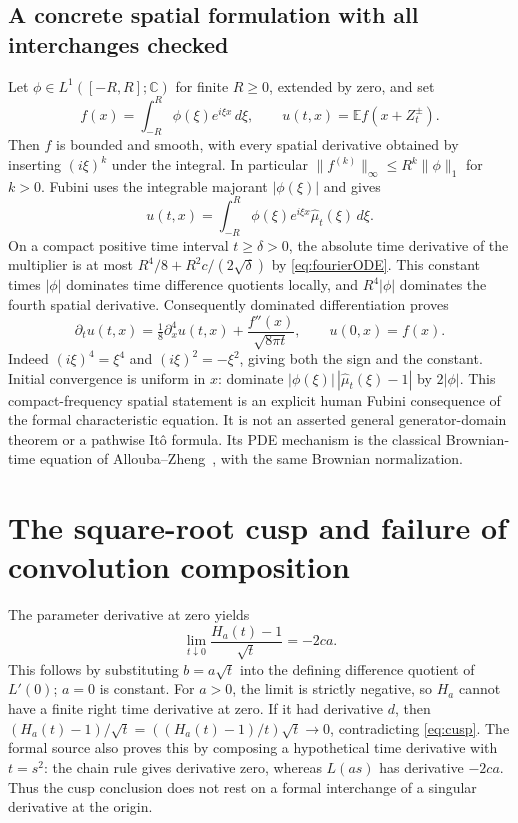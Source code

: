 \documentclass[11pt]{article}
\newcommand{\C}{\mathbb C}
\newcommand{\E}{\mathbb E}
\begin{document}
\subsection*{A concrete spatial formulation with all interchanges checked}
Let $\phi\in L^1([-R,R];\C)$ for finite $R\geq0$, extended by zero, and set
\[
 f(x)=\int_{-R}^R\phi(\xi)e^{i\xi x}\,d\xi,
 \qquad u(t,x)=\E f(x+Z_t^\pm).
\]
Then $f$ is bounded and smooth, with every spatial derivative obtained
by inserting $(i\xi)^k$ under the integral. In particular
$\|f^{(k)}\|_\infty\leq R^k\|\phi\|_1$ for $k>0$.
Fubini uses the integrable majorant $|\phi(\xi)|$ and gives
\[
 u(t,x)=\int_{-R}^R\phi(\xi)e^{i\xi x}
                     \widehat\mu_t(\xi)\,d\xi.
\]
On a compact positive time interval $t\geq\delta>0$, the absolute
time derivative of the multiplier is at most
$R^4/8+R^2c/(2\sqrt\delta)$ by \eqref{eq:fourierODE}.
This constant times $|\phi|$ dominates time difference quotients
locally, and $R^4|\phi|$ dominates the fourth spatial derivative.
Consequently dominated differentiation proves
\begin{equation}\label{eq:PDE}
 \partial_tu(t,x)=\tfrac18\partial_x^4u(t,x)
                  +\frac{f''(x)}{\sqrt{8\pi t}},
 \qquad u(0,x)=f(x).
\end{equation}
Indeed $(i\xi)^4=\xi^4$ and $(i\xi)^2=-\xi^2$, giving both
the sign and the constant. Initial convergence is uniform in $x$:
dominate $|\phi(\xi)|\,|\widehat\mu_t(\xi)-1|$ by $2|\phi|$.
This compact-frequency spatial statement is an explicit human
Fubini consequence of the formal characteristic equation. It is not
an asserted general generator-domain theorem or a pathwise It\^o
formula. Its PDE mechanism is the classical Brownian-time equation
of Allouba--Zheng~\cite{az}, with the same Brownian normalization.

\section{The square-root cusp and failure of convolution composition}
The parameter derivative at zero yields
\begin{equation}\label{eq:cusp}
 \lim_{t\downarrow0}\frac{H_a(t)-1}{\sqrt t}=-2ca.
\end{equation}
This follows by substituting $b=a\sqrt t$ into the defining difference
quotient of $L'(0)$; $a=0$ is constant. For $a>0$, the limit is
strictly negative, so $H_a$ cannot have a finite right time derivative
at zero. If it had derivative $d$, then
$(H_a(t)-1)/\sqrt t=((H_a(t)-1)/t)\sqrt t\to0$,
contradicting \eqref{eq:cusp}. The formal source also proves this by
composing a hypothetical time derivative with $t=s^2$: the chain
rule gives derivative zero, whereas $L(as)$ has derivative $-2ca$.
Thus the cusp conclusion does not rest on a formal interchange of a
singular derivative at the origin.
\end{document}
